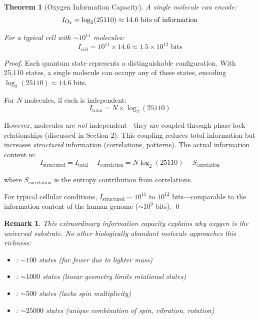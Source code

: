 \documentclass[12pt,a4paper]{article}
\newtheorem{theorem}{Theorem}
\newtheorem{remark}{Remark}
\begin{document}
\begin{theorem}[Oxygen Information Capacity]
\label{thm:oxygen_capacity}
A single  molecule can encode:
\begin{equation}
I_{\ce{O2}} = \log_2(25110) \approx 14.6 \text{ bits of information}
\end{equation}

For a typical cell with $\sim 10^{11}$  molecules:
\begin{equation}
I_{\text{cell}} = 10^{11} \times 14.6 \approx 1.5 \times 10^{12} \text{ bits}
\end{equation}
\end{theorem}

\begin{proof}
Each quantum state represents a distinguishable configuration. With 25,110 states, a single  molecule can occupy any of these states, encoding $\log_2(25110) \approx 14.6$ bits.

For $N$ molecules, if each is independent:
\begin{equation}
I_{\text{total}} = N \times \log_2(25110)
\end{equation}

However, molecules are \textit{not} independent—they are coupled through phase-lock relationships (discussed in Section 2). This coupling reduces total information but increases \textit{structured} information (correlations, patterns). The actual information content is:
\begin{equation}
I_{\text{structured}} = I_{\text{total}} - I_{\text{correlation}} = N \log_2(25110) - S_{\text{correlation}}
\end{equation}

where $S_{\text{correlation}}$ is the entropy contribution from correlations.

For typical cellular conditions, $I_{\text{structured}} \sim 10^{11}$ to $10^{12}$ bits—comparable to the information content of the human genome ($\sim 10^9$ bits). \qed
\end{proof}

\begin{remark}
This extraordinary information capacity explains why oxygen is the universal substrate. No other biologically abundant molecule approaches this richness:
\begin{itemize}
\item {}: $\sim 100$ states (far fewer due to lighter mass)
\item {}: $\sim 1000$ states (linear geometry limits rotational states)
\item {}: $\sim 500$ states (lacks spin multiplicity)
\item {}: $\sim 25000$ states (unique combination of spin, vibration, rotation)
\end{itemize}
\end{remark}
\end{document}
